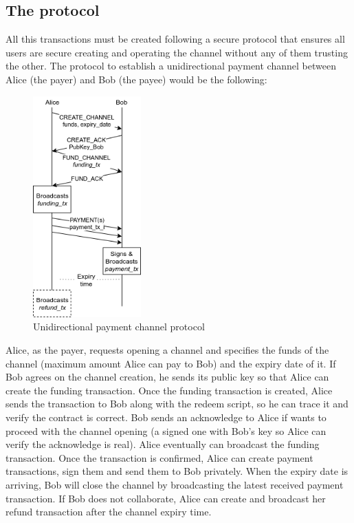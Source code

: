 \documentclass[12pt,journal,compsoc]{IEEEtran}
\begin{document}
\subsection{The protocol}
All this transactions must be created following a secure protocol that ensures all users are secure creating and operating the channel without any of them trusting the other. The protocol to establish a unidirectional payment channel between Alice (the payer) and Bob (the payee) would be the following:
\begin{figure}[h]
    \begin{center}
        \includegraphics[height=8.5cm]{unidir-pc}
        \caption{Unidirectional payment channel protocol}
    \end{center}
\end{figure}
Alice, as the payer, requests opening a channel and specifies the funds of the channel (maximum amount Alice can pay to Bob) and the expiry date of it. If Bob agrees on the channel creation, he sends its public key so that Alice can create the funding transaction. Once the funding transaction is created, Alice sends the transaction to Bob along with the redeem script, so he can trace it and verify the contract is correct. Bob sends an acknowledge to Alice if wants to proceed with the channel opening (a signed one with Bob's key so Alice can verify the acknowledge is real). Alice eventually can broadcast the funding transaction. Once the transaction is confirmed, Alice can create payment transactions, sign them and send them to Bob privately. When the expiry date is arriving, Bob will close the channel by broadcasting the latest received payment transaction. If Bob does not collaborate, Alice can create and broadcast her refund transaction after the channel expiry time.
\end{document}
